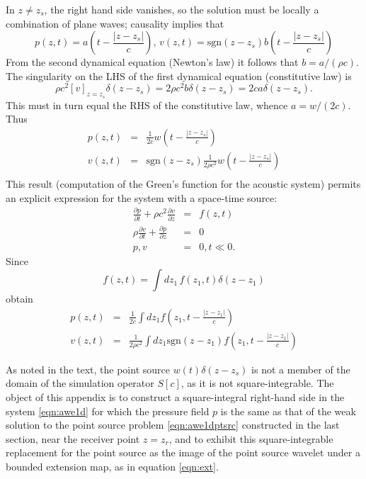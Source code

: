 In $z \ne z_s$, the right hand side 
vanishes, so the solution must be locally a combination of plane
waves; causality implies that
\[
p(z,t)=a\left(t -\frac{|z-z_s|}{c}\right), \, v(z,t)=\mbox{sgn}(z-z_s) b\left(t -
  \frac{|z-z_s|}{c}\right)
\]
From the second dynamical equation (Newton's law) it follows that $b =
a/(\rho c)$. The singularity on the LHS of the first dynamical
equation (constitutive law) is
\[
\rho c^2 [v]_{z=z_s}\delta(z-z_s) =
2\rho c^2 b\delta(z-z_s) = 2c a\delta(z-z_s).
\] 
This must in turn equal the RHS of the constitutive law, whence
$a=w/(2c)$. Thus
\begin{eqnarray}
\label{eqn:sol1dptsrc}
p(z,t) &=& \frac{1}{2c}w\left(t - \frac{|z-z_s|}{c}\right) \nonumber \\
v(z,t) &=& \mbox{sgn}(z-z_s)\frac{1}{2\rho c^2}w\left(t -\frac{|z-z_s|}{c}\right)
           \nonumber \\
\end{eqnarray}
This result (computation of the Green's function for the acoustic
system) permits an explicit expression for the system with a
space-time source:
\begin{eqnarray}
\label{eqn:awe1d}
\frac{\partial p}{\partial t} +\rho c^2\frac{\partial 
  v}{\partial z} &=& f(z,t) \nonumber\\
\rho \frac{\partial v}{\partial t} + \frac{\partial p}{\partial 
  z}&=&0\nonumber\\
 p,v&=&0, t \ll 0. 
\end{eqnarray}
Since
\[
  f(z,t) = \int dz_1\,f(z_1,t)\delta(z-z_1)
\]
obtain
\begin{eqnarray}
\label{eqn:sol1dp}
p(z,t) &=& \frac{1}{2c}\int dz_1 f\left(z_1,t -
           \frac{|z-z_1|}{c}\right) \\
  \label{eqn:sol1dv}
v(z,t) &=& \frac{1}{2\rho c^2} \int dz_1 \mbox{sgn} (z-z_1) f\left(z_1,t - \frac{|z-z_1|}{c}\right)
\end{eqnarray}


As noted in the text, the point source $w(t)\delta(z-z_s)$ is not a
member of the domain of the simulation operator $S[c]$, as it is not
square-integrable. The object of this appendix is to construct a square-integral right-hand side in the
system \ref{eqn:awe1d} for which the pressure field $p$
is the same as that of the weak solution to the point source problem \ref{eqn:awe1dptsrc}
constructed in the last section, near the receiver point $z=z_r$, and
to exhibit this square-integrable replacement for the point source as
the image of the point source wavelet under a bounded extension map,
as in equation \ref{eqn:ext}.


